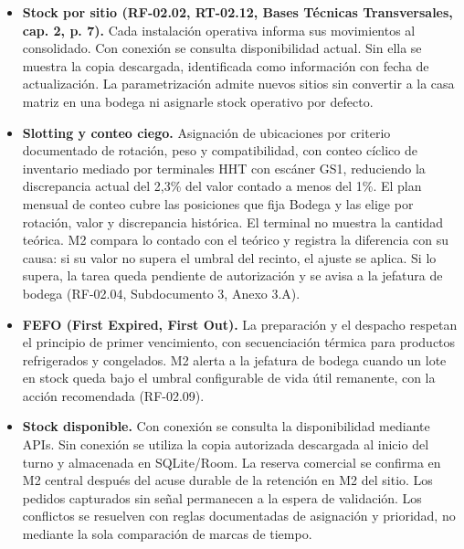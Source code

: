 \begin{itemize}
  \item \textbf{Stock por sitio (RF-02.02, RT-02.12, Bases Técnicas Transversales, cap. 2, p. 7).} Cada instalación operativa informa sus movimientos al consolidado. Con conexión se consulta disponibilidad actual. Sin ella se muestra la copia descargada, identificada como información con fecha de actualización. La parametrización admite nuevos sitios sin convertir a la casa matriz en una bodega ni asignarle stock operativo por defecto.
\item \textbf{Slotting y conteo ciego.} Asignación de ubicaciones por criterio documentado de rotación, peso y compatibilidad, con conteo cíclico de inventario mediado por terminales HHT con escáner GS1, reduciendo la discrepancia actual del 2,3\% del valor contado a menos del 1\%. El plan mensual de conteo cubre las posiciones que fija Bodega y las elige por rotación, valor y discrepancia histórica. El terminal no muestra la cantidad teórica. M2 compara lo contado con el teórico y registra la diferencia con su causa: si su valor no supera el umbral del recinto, el ajuste se aplica. Si lo supera, la tarea queda pendiente de autorización y se avisa a la jefatura de bodega (RF-02.04, Subdocumento 3, Anexo 3.A).
\item \textbf{FEFO (First Expired, First Out).} La preparación y el despacho respetan el principio de primer vencimiento, con secuenciación térmica para productos refrigerados y congelados. M2 alerta a la jefatura de bodega cuando un lote en stock queda bajo el umbral configurable de vida útil remanente, con la acción recomendada (RF-02.09).
  \item \textbf{Stock disponible.} Con conexión se consulta la disponibilidad mediante APIs. Sin conexión se utiliza la copia autorizada descargada al inicio del turno y almacenada en SQLite/Room. La reserva comercial se confirma en M2 central después del acuse durable de la retención en M2 del sitio. Los pedidos capturados sin señal permanecen a la espera de validación. Los conflictos se resuelven con reglas documentadas de asignación y prioridad, no mediante la sola comparación de marcas de tiempo.


\end{itemize}
